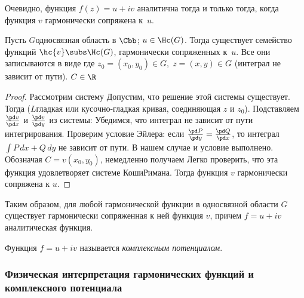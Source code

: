 \documentclass[a4paper]{article}
\begin{document}
\begin{theorem}
Очевидно, функция $f(z)=u+iv$ аналитична тогда и только тогда, когда функция $v$ гармонически сопряжена к~$u$.

\begin{stm}
Пусть  $G$\т односвязная область в $\Cbb$; $u \in \Hc(G)$.
Тогда существует семейство функций $\hc{v} \subs \Hc(G)$, гармонически сопряженных к~$u$.
Все они записываются в виде
где $z_0=(x_0, y_0)\in G, \; z=(x,y)\in G$ (интеграл не зависит от пути). $C\in \R$
\end{stm}
\begin{proof}
Рассмотрим систему
Допустим,  что решение этой системы существует. Тогда
($L$\т гладкая или кусочно-гладкая кривая, соединяющая $z$ и $z_0$). Подставляем
$\frac{\pd v}{\pd x}$ и $\frac{\pd v}{\pd y}$ из системы:
Убедимся, что интеграл не зависит от пути интегрирования. Проверим условие Эйлера: если
$\frac{\pd P}{\pd y}=\frac{\pd Q}{\pd x}$, то интеграл $\int P\,dx+Q\,dy$ не зависит от пути.
В нашем случае
и
 условие выполнено. Обозначая $C=v(x_0, y_0)$, немедленно получаем
Легко проверить, что эта функция удовлетворяет системе Коши\ч Римана. Тогда функция $v$ гармонически сопряжена к $u$.
\end{proof}

Таким образом, для любой гармонической функции в односвязной области $G$ существует гармонически
сопряженная к ней функция $v$, причем $f=u+iv$\т аналитическая функция.

\begin{df}
Функция $f=u+iv$ называется \emph{комплексным потенциалом}.
\end{df}

\subsubsection{Физическая интерпретация гармонических функций и комплексного потенциала}


\end{theorem}
\end{document}
